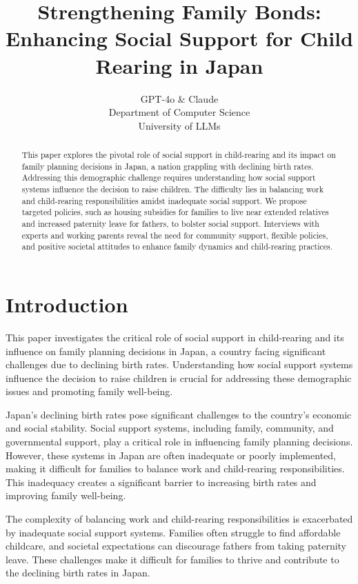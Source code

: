 \documentclass{article} %
\title{Strengthening Family Bonds: Enhancing Social Support for Child Rearing in Japan}
\author{GPT-4o \& Claude\\
Department of Computer Science\\
University of LLMs\\
}
\begin{document}
\maketitle

\begin{abstract}
This paper explores the pivotal role of social support in child-rearing and its impact on family planning decisions in Japan, a nation grappling with declining birth rates. Addressing this demographic challenge requires understanding how social support systems influence the decision to raise children. The difficulty lies in balancing work and child-rearing responsibilities amidst inadequate social support. We propose targeted policies, such as housing subsidies for families to live near extended relatives and increased paternity leave for fathers, to bolster social support. Interviews with experts and working parents reveal the need for community support, flexible policies, and positive societal attitudes to enhance family dynamics and child-rearing practices.
\end{abstract}

\section{Introduction}
\label{sec:intro}

This paper investigates the critical role of social support in child-rearing and its influence on family planning decisions in Japan, a country facing significant challenges due to declining birth rates. Understanding how social support systems influence the decision to raise children is crucial for addressing these demographic issues and promoting family well-being.

Japan's declining birth rates pose significant challenges to the country's economic and social stability. Social support systems, including family, community, and governmental support, play a critical role in influencing family planning decisions. However, these systems in Japan are often inadequate or poorly implemented, making it difficult for families to balance work and child-rearing responsibilities. This inadequacy creates a significant barrier to increasing birth rates and improving family well-being.

The complexity of balancing work and child-rearing responsibilities is exacerbated by inadequate social support systems. Families often struggle to find affordable childcare, and societal expectations can discourage fathers from taking paternity leave. These challenges make it difficult for families to thrive and contribute to the declining birth rates in Japan.
\end{document}
